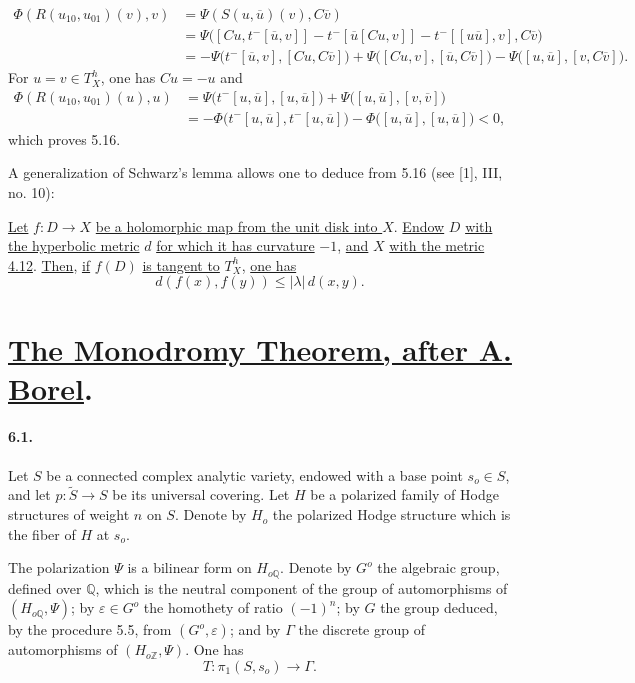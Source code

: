\documentclass[10pt,leqno]{article}
\newcommand{\Z}{\mathbb Z}
\newcommand{\Q}{\mathbb Q}
\theoremstyle{deligne}
\renewcommand{\underline}[1]{\uline{#1}}
\begin{document}
\[
\begin{aligned}
\Phi(R(u_{10},u_{01})(v),v)
&=\Psi(S(u,\overline u)(v),C\overline v)\\
&=\Psi\bigl([Cu,t^-[\overline u,v]]-t^-[\overline u[Cu,v]]-t^-[[u\overline u],v],C\overline v\bigr)\\
&=-\Psi\bigl(t^-[\overline u,v],[Cu,C\overline v]\bigr)
  +\Psi\bigl([Cu,v],[\overline u,C\overline v]\bigr)
  -\Psi\bigl([u,\overline u],[v,C\overline v]\bigr).
\end{aligned}
\]
For $u=v\in T_X^h$, one has $Cu=-u$ and
\[
\begin{aligned}
\Phi(R(u_{10},u_{01})(u),u)
&=\Psi\bigl(t^-[u,\overline u],[u,\overline u]\bigr)
  +\Psi\bigl([u,\overline u],[v,\overline v]\bigr)\\
&=-\Phi\bigl(t^-[u,\overline u],t^-[u,\overline u]\bigr)
  -\Phi\bigl([u,\overline u],[u,\overline u]\bigr)<0,
\end{aligned}
\]
which proves 5.16.

A generalization of Schwarz's lemma allows one to deduce from 5.16 (see [1], III, no. 10):

\begin{corollary}[5.17]
\underline{Let} $f:D\to X$ \underline{be a holomorphic map from the unit disk into $X$}. \underline{Endow} $D$ \underline{with the hyperbolic metric} $d$ \underline{for which it has curvature} $-1$, \underline{and} $X$ \underline{with the metric 4.12}. \underline{Then}, \underline{if} $f(D)$ \underline{is tangent to} $T_X^h$, \underline{one has}
\[
  d(f(x),f(y))\le |\lambda|\,d(x,y).
\]
\end{corollary}

\section{\underline{The Monodromy Theorem, after A. Borel}.}

\paragraph{6.1.}
Let $S$ be a connected complex analytic variety, endowed with a base point $s_o\in S$, and let $p:\widetilde S\to S$ be its universal covering. Let $H$ be a polarized family of Hodge structures of weight $n$ on $S$. Denote by $H_o$ the polarized Hodge structure which is the fiber of $H$ at $s_o$.

The polarization $\Psi$ is a bilinear form on $H_{o\Q}$. Denote by $G^o$ the algebraic group, defined over $\Q$, which is the neutral component of the group of automorphisms of $(H_{o\Q},\Psi)$; by $\varepsilon\in G^o$ the homothety of ratio $(-1)^n$; by $G$ the group deduced, by the procedure 5.5, from $(G^o,\varepsilon)$; and by $\Gamma$ the discrete group of automorphisms of $(H_{o\Z},\Psi)$. One has
\[
\tag{6.1.1}
  T:\pi_1(S,s_o)\longrightarrow\Gamma .
\]
\end{document}
